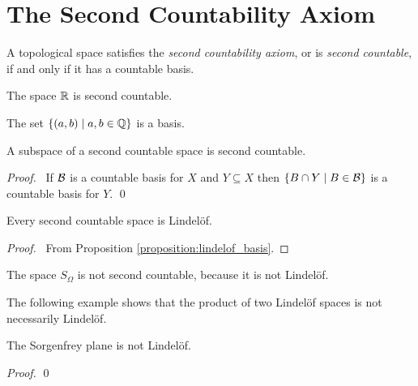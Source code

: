 \section{The Second Countability Axiom}

\begin{definition}
    A topological space satisfies the \emph{second countability axiom},
    or is \emph{second countable}, if and only if it has a countable basis.    
\end{definition}

\begin{example}
    The space $\mathbb{R}$ is second countable.

    The set $\{ (a,b) \mid a,b \in \mathbb{Q} \}$ is a basis.
\end{example}

\begin{proposition}
    \label{proposition:second_countable_subspace}
    A subspace of a second countable space is second countable.
\end{proposition}

\begin{proof}
    \pf\ If $\mathcal{B}$ is a countable basis for $X$ and $Y \subseteq X$
    then $\{ B \cap Y \mid B \in \mathcal{B} \}$ is a countable basis for $Y$. \qed
\end{proof}

\begin{proposition}[CC]
    \label{proposition:lindelof_second_countable}
    Every second countable space is Lindel\"{o}f.
\end{proposition}

\begin{proof}
    \pf\ From Proposition \ref{proposition:lindelof_basis}.
\end{proof}

\begin{example}
    The space $S_\Omega$ is not second countable, because it is not Lindel\"{o}f.
\end{example}

The following example shows that the product of two Lindel\"{o}f spaces is not
necessarily Lindel\"{o}f.
\begin{example}
    The Sorgenfrey plane is not Lindel\"{o}f.
    
    \begin{proof}
        \pf
        \step{3}{\pflet{$\UU = \{ [a,b) \times [a,-d) \mid a,b,d \in \RR \}$}}
        \qed
    \end{proof}
\end{example}

